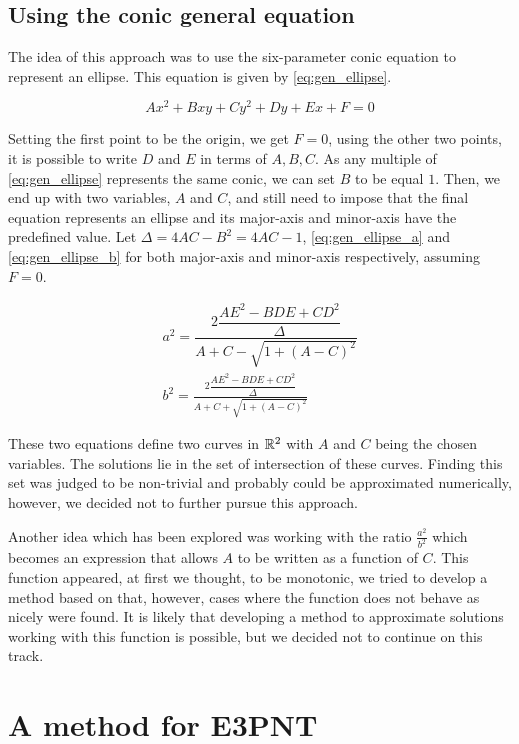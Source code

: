 \subsection{Using the conic general equation}

The idea of this approach was to use the six-parameter conic equation to represent an ellipse. This equation is given by \autoref{eq:gen_ellipse}.

\begin{equation}\label{eq:gen_ellipse}
Ax^2+Bxy+Cy^2+Dy+Ex+F=0
\end{equation}

Setting the first point to be the origin, we get $F=0$, using the other two points, it is possible to write $D$ and $E$ in terms of $A, B, C$. As any multiple of \autoref{eq:gen_ellipse} represents the same conic, we can set $B$ to be equal $1$. Then, we end up with two variables, $A$ and $C$, and still need to impose that the final equation represents an ellipse and its major-axis and minor-axis have the predefined value. Let $\Delta=4AC-B^2=4AC-1$, \autoref{eq:gen_ellipse_a} and \autoref{eq:gen_ellipse_b} for both major-axis and minor-axis respectively, assuming $F=0$.

\begin{align}\label{eq:gen_ellipse_a}
a^2 = \dfrac{2\dfrac{AE^2 -BDE +CD^2}{\Delta}}{A + C - \sqrt{1 + (A-C)^2}}\\
\label{eq:gen_ellipse_b}b^2 = \frac{2\dfrac{AE^2 -BDE +CD^2}{\Delta}}{A + C + \sqrt{1 + (A-C)^2}}
\end{align}

These two equations define two curves in $\mathbb{R}^2$ with $A$ and $C$ being the chosen variables. The solutions lie in the set of intersection of these curves. Finding this set was judged to be non-trivial and probably could be approximated numerically, however, we decided not to further pursue this approach.

Another idea which has been explored was working with the ratio $\frac{a^2}{b^2}$ which becomes an expression that allows $A$ to be written as a function of $C$. This function appeared, at first we thought, to be monotonic, we tried to develop a method based on that, however, cases where the function does not behave as nicely were found. It is likely that developing a method to approximate solutions working with this function is possible, but we decided not to continue on this track.


\section{A method for E3PNT}


